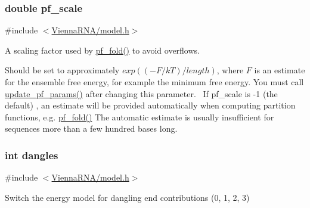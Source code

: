 \subsubsection[{pf\+\_\+scale}]{\setlength{\rightskip}{0pt plus 5cm}double pf\+\_\+scale}\label{group__model__details_gad3b22044065acc6dee0af68931b52cfd}


{\ttfamily \#include $<$\hyperlink{model_8h}{Vienna\+R\+N\+A/model.\+h}$>$}



A scaling factor used by \hyperlink{group__pf__fold_gadc3db3d98742427e7001a7fd36ef28c2}{pf\+\_\+fold()} to avoid overflows. 

Should be set to approximately $exp{((-F/kT)/length)}$, where $F$ is an estimate for the ensemble free energy, for example the minimum free energy. You must call \hyperlink{group__pf__fold_ga384e927890f9c034ff09fa66da102d28}{update\+\_\+pf\+\_\+params()} after changing this parameter.~\newline
If pf\+\_\+scale is -\/1 (the default) , an estimate will be provided automatically when computing partition functions, e.\+g. \hyperlink{group__pf__fold_gadc3db3d98742427e7001a7fd36ef28c2}{pf\+\_\+fold()} The automatic estimate is usually insufficient for sequences more than a few hundred bases long. \hypertarget{group__model__details_ga72b511ed1201f7e23ec437e468790d74}{}
\subsubsection[{dangles}]{\setlength{\rightskip}{0pt plus 5cm}int dangles}\label{group__model__details_ga72b511ed1201f7e23ec437e468790d74}


{\ttfamily \#include $<$\hyperlink{model_8h}{Vienna\+R\+N\+A/model.\+h}$>$}



Switch the energy model for dangling end contributions (0, 1, 2, 3) 

